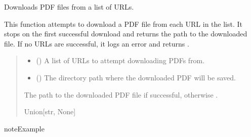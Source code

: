 \documentclass[letterpaper,10pt,english]{sphinxmanual}
\begin{document}
\begin{fulllineitems}
\label{\detokenize{src.utils:src.utils.data.download_pdf_from_urls}}
\pysigstartsignatures
\pysiglinewithargsret
{}
{\sphinxparamcomma {}}
{}
\pysigstopsignatures
\sphinxAtStartPar
Downloads PDF files from a list of URLs.

\sphinxAtStartPar
This function attempts to download a PDF file from each URL in the list. It stops
on the first successful download and returns the path to the downloaded file.
If no URLs are successful, it logs an error and returns .
\begin{quote}\begin{description}
\begin{itemize}
\item {} 
\sphinxAtStartPar
{} (\sphinxstyleliteralemphasis{\sphinxupquote{{[}}}\sphinxstyleliteralemphasis{\sphinxupquote{{]}}}) \textendash{} A list of URLs to attempt downloading PDFs from.

\item {} 
\sphinxAtStartPar
{} () \textendash{} The directory path where the downloaded PDF will be saved.

\end{itemize}

\sphinxAtStartPar
The path to the downloaded PDF file if successful, otherwise .

\sphinxAtStartPar
Union{[}str, None{]}

\end{description}\end{quote}

\begin{sphinxadmonition}{note}{Example}


\end{sphinxadmonition}
\end{fulllineitems}
\end{document}
